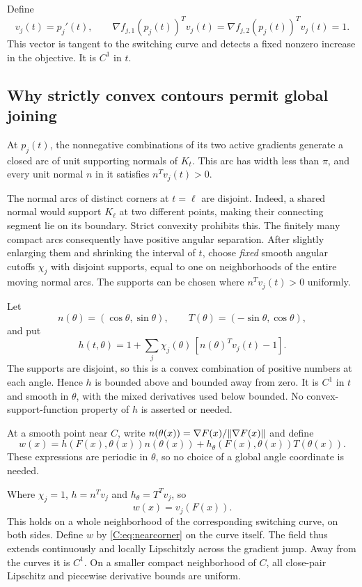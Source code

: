 Define
\begin{equation}\label{C:eq:vel}
 v_j(t)=p_j'(t),\qquad
 \nabla f_{j,1}(p_j(t))^Tv_j(t)
 =\nabla f_{j,2}(p_j(t))^Tv_j(t)=1.
\end{equation}
This vector is tangent to the switching curve and detects a fixed nonzero increase in the objective. It is $C^1$ in $t$.

\subsection{Why strictly convex contours permit global joining}
At $p_j(t)$, the nonnegative combinations of its two active gradients generate a closed arc of unit supporting normals of $K_t$. This arc has width less than $\pi$, and every unit normal $n$ in it satisfies $n^Tv_j(t)>0$.

The normal arcs of distinct corners at $t=\ell$ are disjoint. Indeed, a shared normal would support $K_\ell$ at two different points, making their connecting segment lie on its boundary. Strict convexity prohibits this. The finitely many compact arcs consequently have positive angular separation. After slightly enlarging them and shrinking the interval of $t$, choose \emph{fixed} smooth angular cutoffs $\chi_j$ with disjoint supports, equal to one on neighborhoods of the entire moving normal arcs. The supports can be chosen where $n^Tv_j(t)>0$ uniformly.

Let
\[
 n(\theta)=(\cos\theta,\sin\theta),\qquad
 T(\theta)=(-\sin\theta,\cos\theta),
\]
and put
\begin{equation}\label{C:eq:h}
 h(t,\theta)=1+\sum_j\chi_j(\theta)\,[n(\theta)^Tv_j(t)-1].
\end{equation}
The supports are disjoint, so this is a convex combination of positive numbers at each angle. Hence $h$ is bounded above and bounded away from zero. It is $C^1$ in $t$ and smooth in $\theta$, with the mixed derivatives used below bounded. No convex-support-function property of $h$ is asserted or needed.

At a smooth point near $C$, write $n(\theta(x))=\nabla F(x)/\lVert \nabla F(x)\rVert$ and define
\begin{equation}\label{C:eq:w}
 w(x)=h(F(x),\theta(x))n(\theta(x))
       +h_\theta(F(x),\theta(x))T(\theta(x)).
\end{equation}
These expressions are periodic in $\theta$, so no choice of a global angle coordinate is needed.

Where $\chi_j=1$, $h=n^Tv_j$ and $h_\theta=T^Tv_j$, so
\begin{equation}\label{C:eq:nearcorner}
 w(x)=v_j(F(x)).
\end{equation}
This holds on a whole neighborhood of the corresponding switching curve, on both sides. Define $w$ by \eqref{C:eq:nearcorner} on the curve itself. The field thus extends continuously and locally Lipschitzly across the gradient jump. Away from the curves it is $C^1$. On a smaller compact neighborhood of $C$, all close-pair Lipschitz and piecewise derivative bounds are uniform.

